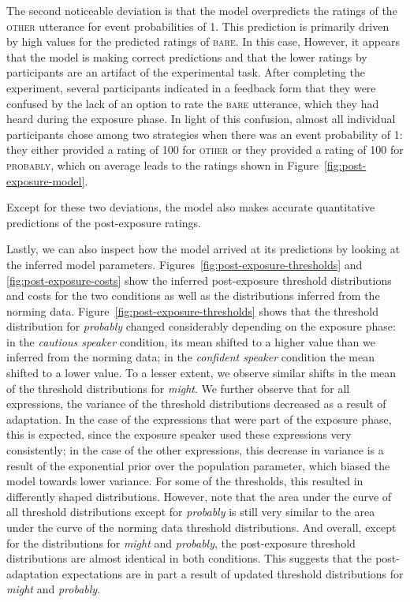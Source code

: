 \documentclass[lucida,biblatex]{sp} %
\newcommand{\figref}[1]{Figure~\ref{#1}}
\begin{document}
The second noticeable deviation is that the model overpredicts the ratings of the \textsc{other} utterance for event probabilities of 1. This prediction is primarily driven by high values for the predicted ratings of \textsc{bare}. In
this case, However, it appears that the model is making correct predictions and that the lower ratings by participants are an artifact of the experimental task. After completing the experiment, 
several participants indicated in a feedback form that they were confused by the lack of an option to rate the \textsc{bare} utterance, 
which they had heard during the exposure phase. In light of this confusion, almost all individual participants chose among two strategies when there was an event probability of 1: they either provided a rating of 100 for \textsc{other} 
or they provided a rating of 100 for \textsc{probably}, which on average leads to the ratings shown in \figref{fig:post-exposure-model}.

Except for these two deviations, the model also makes accurate quantitative predictions of the post-exposure ratings.

Lastly, we can also inspect how the model arrived at its predictions by looking at the inferred model parameters.  
Figures~\ref{fig:post-exposure-thresholds} and \ref{fig:post-exposure-costs} show the inferred
post-exposure threshold distributions and costs for the two conditions as well as the distributions inferred from the norming data.
Figure~\ref{fig:post-exposure-thresholds} shows that the threshold distribution for \textit{probably}
changed considerably depending on the exposure phase: in the \textit{cautious speaker} condition,
its mean shifted to a higher value than we inferred from the norming data; in the \textit{confident speaker} condition the mean 
shifted to a lower value. To a lesser extent, we observe similar shifts in the mean of the threshold
distributions for \textit{might}. We further observe that for all expressions, the variance of the threshold
distributions decreased as a result of adaptation. In the case of the expressions that were part of the exposure
phase, this is expected, since the exposure speaker used these expressions very consistently; in the case of the
other expressions, this decrease in variance is a result of the exponential prior over the population parameter,
which biased the model towards lower variance. For some of the thresholds, this resulted in differently shaped distributions.
However, note that the area under the curve of all threshold distributions except for \textit{probably} is still very similar to the 
area under the curve of the norming data threshold distributions. And overall, except for the distributions
for \textit{might} and \textit{probably}, the post-exposure threshold distributions are almost identical in both conditions.
This suggests that the post-adaptation expectations 
are in part a result of updated threshold distributions for \textit{might} and \textit{probably}.
\end{document}
